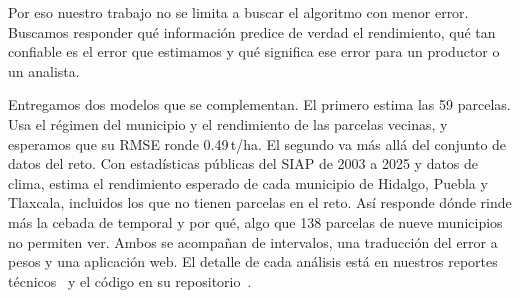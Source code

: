 Por eso nuestro trabajo no se limita a buscar el algoritmo con menor error. Buscamos responder qué información predice
de verdad el rendimiento, qué tan confiable es el error que estimamos y qué significa ese error para un productor o un
analista.

Entregamos dos modelos que se complementan. El primero estima las 59 parcelas. Usa el régimen del municipio y el
rendimiento de las parcelas vecinas, y esperamos que su RMSE ronde 0.49\,t/ha. El segundo va más allá del
conjunto de datos del reto. Con estadísticas públicas del SIAP de 2003 a 2025 y datos de clima, estima el rendimiento
esperado de cada municipio de Hidalgo, Puebla y Tlaxcala, incluidos los que no tienen parcelas en el reto. Así responde dónde
rinde más la cebada de temporal y por qué, algo que 138 parcelas de nueve municipios no permiten ver. Ambos se
acompañan de intervalos, una traducción del error a pesos y una aplicación web. El detalle de cada
análisis está en nuestros reportes técnicos~\cite{doc_contexto,doc_modelo,doc_regimenes,doc_generalizable} y el código
en su repositorio~\cite{repo}.
